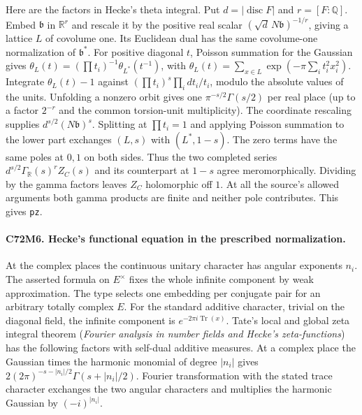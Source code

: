 Here are the factors in Hecke's theta integral. Put
$d=|\operatorname{disc}F|$ and $r=[F:\mathbb Q]$. Embed
$\mathfrak b$ in $\mathbb R^r$ and rescale it by the positive real
scalar $(\sqrt d\,N\mathfrak b)^{-1/r}$, giving a lattice $L$ of
covolume one. Its Euclidean dual has the same covolume-one normalization
of $\mathfrak b^*$. For positive diagonal $t$, Poisson summation for
the Gaussian gives
$\theta_L(t)=(\prod t_i)^{-1}\theta_{L^*}(t^{-1})$, with
$\theta_L(t)=\sum_{x\in L}\exp(-\pi\sum_i t_i^2x_i^2)$.
Integrate $\theta_L(t)-1$ against
$(\prod t_i)^s\prod_i dt_i/t_i$, modulo the absolute values
of the units. Unfolding a nonzero orbit gives one
$\pi^{-s/2}\Gamma(s/2)$ per real place (up to a factor $2^{-r}$
and the common torsion-unit multiplicity). The coordinate rescaling
supplies $d^{s/2}(N\mathfrak b)^s$.
Splitting at $\prod t_i=1$ and applying Poisson summation to the
lower part exchanges $(L,s)$ with $(L^*,1-s)$. The zero terms have
the same poles at $0,1$ on both sides. Thus the two completed series
$d^{s/2}\Gamma_{\mathbb R}(s)^r Z_C(s)$ and its counterpart at
$1-s$ agree meromorphically. Dividing by the gamma factors leaves
$Z_C$ holomorphic off $1$. At all the source's allowed arguments both
gamma products are finite and neither pole contributes. This gives
\texttt{pz}.

\paragraph{C72M6. Hecke's functional equation in the prescribed normalization.}
At the complex places the continuous unitary character has angular
exponents $n_i$. The asserted formula on $E^\times$ fixes the whole
infinite component by weak approximation. The type selects one
embedding per conjugate pair for an arbitrary totally complex $E$.
For the standard additive character, trivial on the diagonal field,
the infinite component is $e^{-2\pi i\operatorname{Tr}(x)}$.
Tate's local and global zeta integral theorem
(\emph{Fourier analysis in number fields and Hecke's zeta-functions})
has the following factors with self-dual additive measures.
At a complex place the Gaussian times the harmonic monomial of degree
$|n_i|$ gives $2(2\pi)^{-s-|n_i|/2}\Gamma(s+|n_i|/2)$.
Fourier transformation with the stated trace character exchanges the
two angular characters and multiplies the harmonic Gaussian by
$(-i)^{|n_i|}$.

